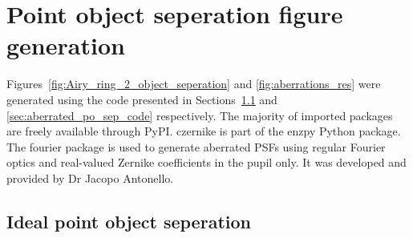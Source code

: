 \chapter{Point object seperation figure generation}

Figures~\ref{fig:Airy_ring_2_object_seperation} and 
\ref{fig:aberrations_res} were generated using the code 
presented in Sections~\ref{sec:ideal_po_sep_code} and 
\ref{sec:aberrated_po_sep_code} respectively. The majority of 
imported packages are freely available through PyPI. 
czernike is part of the enzpy Python package. The fourier 
package is used to generate aberrated PSFs using regular
Fourier optics\cite{schmidt2010numerical} and real-valued 
Zernike coefficients in the pupil only. It was developed and 
provided by Dr Jacopo Antonello.

\section{Ideal point object seperation}
\label{sec:ideal_po_sep_code}

